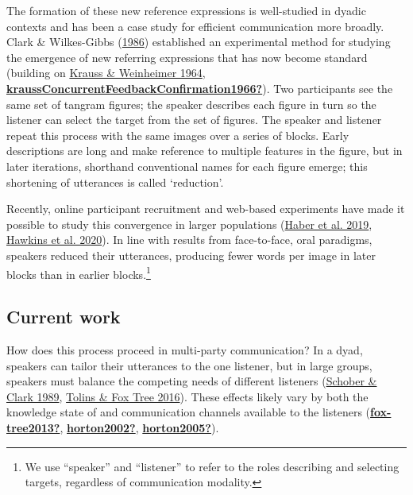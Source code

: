 \documentclass[
  english,
  a4paper,
]{article}
\begin{document}
The formation of these new reference expressions is well-studied in dyadic contexts and has been a case study for efficient communication more broadly. Clark \& Wilkes-Gibbs (\protect\hyperlink{ref-clarkReferringCollaborativeProcess1986}{1986}) established an experimental method for studying the emergence of new referring expressions that has now become standard (building on \protect\hyperlink{ref-kraussChangesReferencePhrases1964}{Krauss \& Weinheimer 1964}, \protect\hyperlink{ref-kraussConcurrentFeedbackConfirmation1966}{\textbf{kraussConcurrentFeedbackConfirmation1966?}}). Two participants see the same set of tangram figures; the speaker describes each figure in turn so the listener can select the target from the set of figures. The speaker and listener repeat this process with the same images over a series of blocks. Early descriptions are long and make reference to multiple features in the figure, but in later iterations, shorthand conventional names for each figure emerge; this shortening of utterances is called `reduction'.

Recently, online participant recruitment and web-based experiments have made it possible to study this convergence in larger populations (\protect\hyperlink{ref-haber2019}{Haber et al. 2019}, \protect\hyperlink{ref-hawkinsCharacterizingDynamicsLearning2020}{Hawkins et al. 2020}). In line with results from face-to-face, oral paradigms, speakers reduced their utterances, producing fewer words per image in later blocks than in earlier blocks.\footnote{We use ``speaker'' and ``listener'' to refer to the roles describing and selecting targets, regardless of communication modality.}

\hypertarget{current-work}{%
\subsection{Current work}\label{current-work}}

How does this process proceed in multi-party communication? In a dyad, speakers can tailor their utterances to the one listener, but in large groups, speakers must balance the competing needs of different listeners (\protect\hyperlink{ref-schober1989}{Schober \& Clark 1989}, \protect\hyperlink{ref-tolins2016}{Tolins \& Fox Tree 2016}). These effects likely vary by both the knowledge state of and communication channels available to the listeners (\protect\hyperlink{ref-fox-tree2013}{\textbf{fox-tree2013?}}, \protect\hyperlink{ref-horton2002}{\textbf{horton2002?}}, \protect\hyperlink{ref-horton2005}{\textbf{horton2005?}}).
\end{document}
